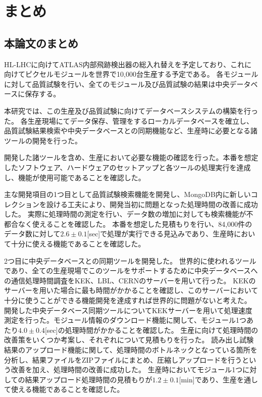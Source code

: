 \chapter{まとめ}

\section{本論文のまとめ}
HL-LHCに向けてATLAS内部飛跡検出器の総入れ替えを予定しており、これに向けてピクセルモジュールを世界で10,000台生産する予定である。
各モジュールに対して品質試験を行い、全てのモジュール及び品質試験の結果は中央データベースに保存する。

本研究では、この生産及び品質試験に向けてデータベースシステムの構築を行った。
各生産現場にてデータ保存、管理をするローカルデータベースを確立し、品質試験結果検索や中央データベースとの同期機能など、生産時に必要となる諸ツールの開発を行った。

開発した諸ツールを含め、生産において必要な機能の確認を行った。本番を想定したソフトウェア、ハードウェアのセットアップと各ツールの処理実行を達成し、機能が使用可能であることを確認した。

主な開発項目の1つ目として品質試験検索機能を開発し、MongoDB内に新しいコレクションを設ける工夫により、開発当初に問題となった処理時間の改善に成功した。
実際に処理時間の測定を行い、データ数の増加に対しても検索機能が不都合なく使えることを確認した。
本番を想定した見積もりを行い、84,000件のデータ数に対して$2.6\pm0.1$[sec]で処理が実行できる見込みであり、生産時において十分に使える機能であることを確認した。

2つ目に中央データベースとの同期ツールを開発した。
世界的に使われるツールであり、全ての生産現場でこのツールをサポートするために中央データベースへの通信処理時間調査をKEK、LBL、CERNのサーバーを用いて行った。
KEKのサーバーを用いた場合に最も時間がかかることを確認し、このサーバーにおいて十分に使うことができる機能開発を達成すれば世界的に問題がないと考えた。
開発した中央データベース同期ツールについてKEKサーバーを用いて処理速度測定を行った。モジュール情報のダウンロード機能に関して、モジュール1つあたり$4.0\pm 0.4$[sec]の処理時間がかかることを確認した。
生産に向けて処理時間の改善策をいくつか考案し、それぞれについて見積もりを行った。
読み出し試験結果のアップロード機能に関して、処理時間のボトルネックとなっている箇所を分析し、結果ファイルをZIPファイルにまとめ、圧縮しアップロードを行うという改善を加え、処理時間の改善に成功した。
生産時においてモジュール1つに対しての結果アップロード処理時間の見積もりが$1.2\pm 0.1$[min]であり、生産を通して使える機能であることを確認した。

